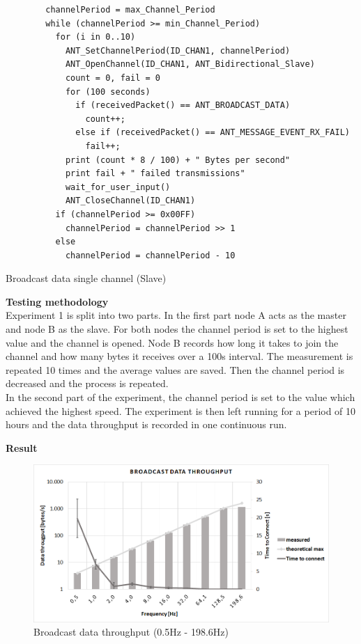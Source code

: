 \begin{description}
	\begin{code}[H]
		\begin{verbatim}
		channelPeriod = max_Channel_Period
		while (channelPeriod >= min_Channel_Period) 
		  for (i in 0..10) 
		    ANT_SetChannelPeriod(ID_CHAN1, channelPeriod)
		    ANT_OpenChannel(ID_CHAN1, ANT_Bidirectional_Slave)
		    count = 0, fail = 0
		    for (100 seconds) 
		      if (receivedPacket() == ANT_BROADCAST_DATA)		        
		        count++;			  
		      else if (receivedPacket() == ANT_MESSAGE_EVENT_RX_FAIL)
		        fail++;
		    print (count * 8 / 100) + " Bytes per second"
		    print fail + " failed transmissions"
		    wait_for_user_input()
		    ANT_CloseChannel(ID_CHAN1)
		  if (channelPeriod >= 0x00FF)
		    channelPeriod = channelPeriod >> 1
		  else
		    channelPeriod = channelPeriod - 10
		\end{verbatim}
		\caption{Broadcast data single channel (Slave)}\label{lst:sExp1}
	\end{code}	
	\item{\textbf{Testing methodology}} \hfill \\Experiment 1 is split into two parts.
	In the first part node A acts as the master and node B as the slave. For both nodes the channel period is set to the highest value and the channel is opened. Node B records how long it takes to join the channel and how many bytes it receives over a 100s interval. The measurement is repeated 10 times and the average values are saved. Then the channel period is decreased and the process is repeated.\\ 
	In the second part of the experiment, the channel period is set to the value which achieved the highest speed. The experiment is then left running for a period of 10 hours and the data throughput is recorded in one continuous run.
	\item{\textbf{Result}} \hfill \\  
	\begin{figure}[H]
		\centering
		\includegraphics[scale=0.5]{content/images/exp1_norm.png}
		\caption{Broadcast data throughput (0.5Hz - 198.6Hz)}\label{fig:exp1norm}
	\end{figure}
	

\end{description}

